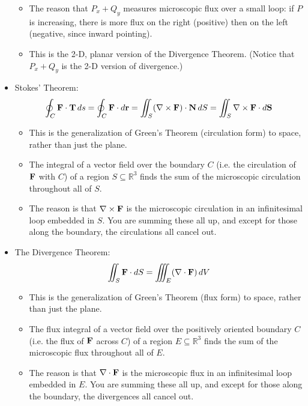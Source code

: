 \begin{itemize}
\begin{itemize}
        \item The reason that \(P_x + Q_y\) measures microscopic flux over a small loop: if \(P\) is increasing, there is more flux on the right (positive) then on the left (negative, since inward pointing).
        \item This is the 2-D, planar version of the Divergence Theorem. (Notice that \(P_x + Q_y\) is the 2-D version of divergence.)
    \end{itemize}
    \item Stokes’ Theorem:
    \[
        \oint_C \mathbf{F} \cdot \mathbf{T} \, ds = \oint_C \mathbf{F} \cdot d\mathbf{r} = \iint_S (\nabla \times \mathbf{F}) \cdot \mathbf{N} \, dS = \iint_S \nabla \times \mathbf{F} \cdot d\mathbf{S}
    \]
    \begin{itemize}
        \item This is the generalization of Green’s Theorem (circulation form) to space, rather than just the plane.
        \item The integral of a vector field over the boundary \(C\) (i.e. the circulation of \(\mathbf{F}\) with \(C\)) of a region \(S \subseteq \mathbb{R}^3\) finds the sum of the microscopic circulation throughout all of \(S\).
        \item The reason is that \(\nabla \times \mathbf{F}\) is the microscopic circulation in an infinitesimal loop embedded in \(S\). You are summing these all up, and except for those along the boundary, the circulations all cancel out.
    \end{itemize}
    \item The Divergence Theorem:
    \[
        \iint_S \mathbf{F} \cdot dS = \iiint_E (\nabla \cdot \mathbf{F}) \, dV
    \]
    \begin{itemize}
        \item This is the generalization of Green’s Theorem (flux form) to space, rather than just the plane.
        \item The flux integral of a vector field over the positively oriented boundary \(C\) (i.e. the flux of \(\mathbf{F}\) across \(C\)) of a region \(E \subseteq \mathbb{R}^3\) finds the sum of the microscopic flux throughout all of \(E\).
        \item The reason is that \(\nabla \cdot \mathbf{F}\) is the microscopic flux in an infinitesimal loop embedded in \(E\). You are summing these all up, and except for those along the boundary, the divergences all cancel out.
    \end{itemize}
\end{itemize}

